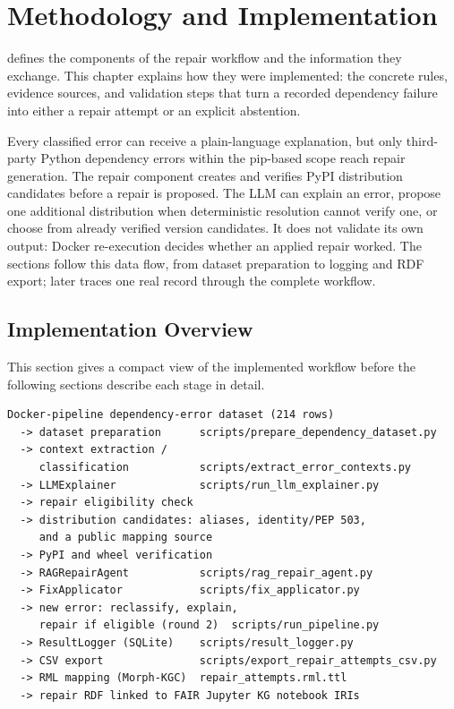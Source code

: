 \chapter{Methodology and Implementation}
\label{chap:methodology}

 defines the components of the repair workflow and
the information they exchange. This chapter explains how they were
implemented: the concrete rules, evidence sources, and validation steps
that turn a recorded dependency failure into either a repair attempt or an
explicit abstention.

Every classified error can receive a plain-language explanation, but only
third-party Python dependency errors within the pip-based scope reach repair
generation. The repair component creates and verifies PyPI distribution
candidates before a repair is proposed. The LLM can explain an error,
propose one additional distribution when deterministic resolution cannot
verify one, or choose from already verified version candidates. It does not
validate its own output: Docker re-execution decides whether an applied
repair worked. The sections follow this data flow, from dataset preparation
to logging and RDF export;  later traces one
real record through the complete workflow.

\section{Implementation Overview}
\label{sec:m-overview}

This section gives a compact view of the implemented workflow before the
following sections describe each stage in detail.

\begin{verbatim}
Docker-pipeline dependency-error dataset (214 rows)
  -> dataset preparation      scripts/prepare_dependency_dataset.py
  -> context extraction /
     classification           scripts/extract_error_contexts.py
  -> LLMExplainer             scripts/run_llm_explainer.py
  -> repair eligibility check
  -> distribution candidates: aliases, identity/PEP 503,
     and a public mapping source
  -> PyPI and wheel verification
  -> RAGRepairAgent           scripts/rag_repair_agent.py
  -> FixApplicator            scripts/fix_applicator.py
  -> new error: reclassify, explain,
     repair if eligible (round 2)  scripts/run_pipeline.py
  -> ResultLogger (SQLite)    scripts/result_logger.py
  -> CSV export               scripts/export_repair_attempts_csv.py
  -> RML mapping (Morph-KGC)  repair_attempts.rml.ttl
  -> repair RDF linked to FAIR Jupyter KG notebook IRIs
\end{verbatim}

